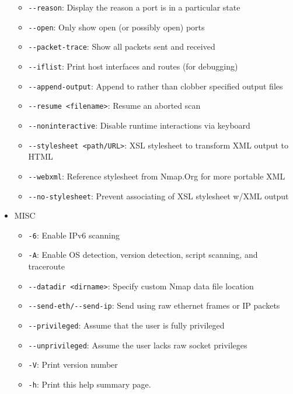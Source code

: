 \begin{itemize}
\begin{itemize}
     \item \verb|--reason|: Display the reason a port is in a particular state
     \item \verb|--open|: Only show open (or possibly open) ports
     \item \verb|--packet-trace|: Show all packets sent and received
     \item \verb|--iflist|: Print host interfaces and routes (for debugging)
     \item \verb|--append-output|: Append to rather than clobber specified output files
     \item \verb|--resume <filename>|: Resume an aborted scan
     \item \verb|--noninteractive|: Disable runtime interactions via keyboard
     \item \verb|--stylesheet <path/URL>|: XSL stylesheet to transform XML output to HTML
     \item \verb|--webxml|: Reference stylesheet from Nmap.Org for more portable XML
     \item \verb|--no-stylesheet|: Prevent associating of XSL stylesheet w/XML output
    \end{itemize}
    \item MISC
    \begin{itemize}
        \item \verb|-6|: Enable IPv6 scanning
        \item \verb|-A|: Enable OS detection, version detection, script scanning, and traceroute
        \item \verb|--datadir <dirname>|: Specify custom Nmap data file location
        \item \verb|--send-eth/--send-ip|: Send using raw ethernet frames or IP packets
        \item \verb|--privileged|: Assume that the user is fully privileged
        \item \verb|--unprivileged|: Assume the user lacks raw socket privileges
        \item \verb|-V|: Print version number
        \item \verb|-h|: Print this help summary page.
    \end{itemize}
\end{itemize}